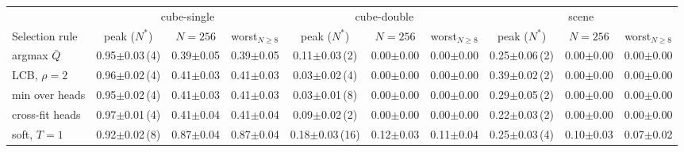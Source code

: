 \begin{tabular}{l ccc ccc ccc}
\toprule
 & \multicolumn{3}{c}{cube-single} & \multicolumn{3}{c}{cube-double} & \multicolumn{3}{c}{scene} \\
\cmidrule(lr){2-4}\cmidrule(lr){5-7}\cmidrule(lr){8-10}
Selection rule & peak ($N^\ast$) & $N{=}256$ & worst$_{N\ge 8}$ & peak ($N^\ast$) & $N{=}256$ & worst$_{N\ge 8}$ & peak ($N^\ast$) & $N{=}256$ & worst$_{N\ge 8}$ \\
\midrule
argmax $\bar Q$ & 0.95{\scriptsize$\pm$0.03}\,(4) & 0.39{\scriptsize$\pm$0.05} & 0.39{\scriptsize$\pm$0.05} & 0.11{\scriptsize$\pm$0.03}\,(2) & 0.00{\scriptsize$\pm$0.00} & 0.00{\scriptsize$\pm$0.00} & 0.25{\scriptsize$\pm$0.06}\,(2) & 0.00{\scriptsize$\pm$0.00} & 0.00{\scriptsize$\pm$0.00} \\
LCB, $\rho{=}2$ & 0.96{\scriptsize$\pm$0.02}\,(4) & 0.41{\scriptsize$\pm$0.03} & 0.41{\scriptsize$\pm$0.03} & 0.03{\scriptsize$\pm$0.02}\,(4) & 0.00{\scriptsize$\pm$0.00} & 0.00{\scriptsize$\pm$0.00} & 0.39{\scriptsize$\pm$0.02}\,(2) & 0.00{\scriptsize$\pm$0.00} & 0.00{\scriptsize$\pm$0.00} \\
min over heads & 0.95{\scriptsize$\pm$0.02}\,(4) & 0.41{\scriptsize$\pm$0.03} & 0.41{\scriptsize$\pm$0.03} & 0.03{\scriptsize$\pm$0.01}\,(8) & 0.00{\scriptsize$\pm$0.00} & 0.00{\scriptsize$\pm$0.00} & 0.29{\scriptsize$\pm$0.05}\,(2) & 0.00{\scriptsize$\pm$0.00} & 0.00{\scriptsize$\pm$0.00} \\
cross-fit heads & 0.97{\scriptsize$\pm$0.01}\,(4) & 0.41{\scriptsize$\pm$0.04} & 0.41{\scriptsize$\pm$0.04} & 0.09{\scriptsize$\pm$0.02}\,(2) & 0.00{\scriptsize$\pm$0.00} & 0.00{\scriptsize$\pm$0.00} & 0.22{\scriptsize$\pm$0.03}\,(2) & 0.00{\scriptsize$\pm$0.00} & 0.00{\scriptsize$\pm$0.00} \\
soft, $T{=}1$ & 0.92{\scriptsize$\pm$0.02}\,(8) & 0.87{\scriptsize$\pm$0.04} & 0.87{\scriptsize$\pm$0.04} & 0.18{\scriptsize$\pm$0.03}\,(16) & 0.12{\scriptsize$\pm$0.03} & 0.11{\scriptsize$\pm$0.04} & 0.25{\scriptsize$\pm$0.03}\,(4) & 0.10{\scriptsize$\pm$0.03} & 0.07{\scriptsize$\pm$0.02} \\
\bottomrule
\end{tabular}
